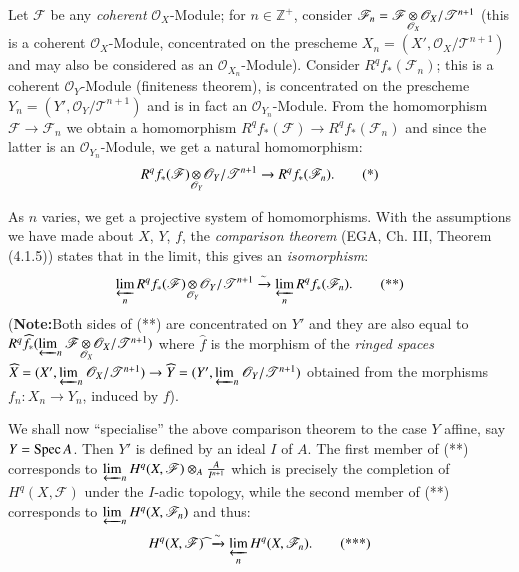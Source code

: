 Let $\mathscr{F}$ be any {\em coherent} $\mathscr{O}_{X}$-Module; for
$n\in \mathbb{Z}^{+}$, consider
$\mathscr{F}_{n}=\foprod{\mathscr{F}}{\mathscr{O}_{X}/\mathscr{T}^{n+1}}{\mathscr{O}_{X}}$
(this is a coherent $\mathscr{O}_{X}$-Module, concentrated on the
pre\-scheme $X_{n}=(X',\mathscr{O}_{X}/\mathscr{T}^{n+1})$ and may also
be considered as an $\mathscr{O}_{X_{n}}$-Module). Consider
$R^{q}f_{\ast}(\mathscr{F}_{n})$; this is a coherent
$\mathscr{O}_{Y}$-Module (finiteness theorem), is concentrated on the
prescheme $Y_{n}=(Y',\mathscr{O}_{Y}/\mathscr{T}^{n+1})$ and is in
fact an $\mathscr{O}_{Y_{n}}$-Module. From the homomorphism
$\mathscr{F}\to \mathscr{F}_{n}$ we obtain a homomorphism
$R^{q}f_{\ast}(\mathscr{F})\to R^{q}f_{\ast}(\mathscr{F}_{n})$ and
since the latter is an $\mathscr{O}_{Y_{n}}$-Module, we get a natural
homomorphism: 
\begin{equation*}
\foprod{R^{q}f_{\ast}(\mathscr{F})}{\mathscr{O}_{Y}/\mathscr{T}^{n+1}}{\mathscr{O}_{Y}}\to
R^{q}f_{\ast}(\mathscr{F}_{n}).\tag{*} 
\end{equation*}

As $n$ varies, we get a projective system of homomorphisms. With the
assumptions we have made about $X$, $Y$, $f$, the {\em comparison
  theorem} (EGA, Ch. III, Theorem (4.1.5)) states that in the limit,
this gives an {\em isomorphism}:
\begin{equation*}
\foprod{\varprojlim_{n}R^{q}f_{\ast}(\mathscr{F})}{\mathscr{O}_{Y}/\mathscr{T}^{n+1}}{\mathscr{O}_{Y}}\xrightarrow{\sim}\varprojlim_{n}R^{q}f_{\ast}(\mathscr{F}_{n}). \tag{**}
\end{equation*}
({\bf Note:}\pageoriginale Both sides of (**) are concentrated on $Y'$
and they are also equal to
$R^{q}\widehat{f}_{\ast}(\varprojlim_{n}\foprod{\mathscr{F}}{\mathscr{O}_{X}/\mathscr{T}^{n+1}}{\mathscr{O}_{X}})$
where $\widehat{f}$ is the morphism of the {\em ringed spaces}
$\widehat{X}=(X',\varprojlim_{n}\mathscr{O}_{X}/\mathscr{T}^{n+1})\to
\widehat{Y}=(Y',\varprojlim_{n}\mathscr{O}_{Y}/\mathscr{T}^{n+1})$
obtained from the morphisms $f_{n}:X_{n}\to Y_{n}$, induced by $f$).

We shall now ``specialise'' the above comparison theorem to the case
$Y$ affine, say $Y=\operatorname{Spec} A$. Then $Y'$ is defined by an ideal $I$ of
$A$. The first member of (**) corresponds to
$\varprojlim_{n}H^{q}(X,\mathscr{F})\otimes_{A}\frac{A}{I^{n+1}}$
which is precisely the completion of $H^{q}(X,\mathscr{F})$ under the
$I$-adic topology, while the second member of (**) corresponds to
$\varprojlim_{n}H^{q}(X,\mathscr{F}_{n})$ and thus: 
\begin{equation*}
H^{q}(X,\mathscr{F})\sphat
\xrightarrow{\sim}\varprojlim_{n}H^{q}(X,\mathscr{F}_{n}). \tag{{*}{**}}
\end{equation*}

